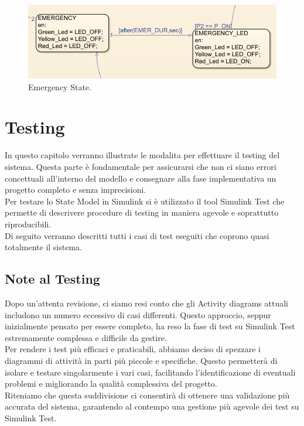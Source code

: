 \documentclass[12pt]{article}
\begin{document}
\begin{figure}[H]
    \centering
    \includegraphics[width=1\textwidth]{imm/Emergency.png}
    \caption{Emergency State.}
\end{figure}

\newpage
\section{Testing}

In questo capitolo verranno illustrate le modalita per effettuare il testing del sistema. Questa parte è fondamentale per assicurarsi che non ci siano errori concettuali all'interno del modello e consegnare alla fase implementativa un progetto completo e senza imprecisioni.\\
Per testare lo State Model in Simulink si è utilizzato il tool Simulink Test che permette di descrivere procedure di testing in maniera agevole e soprattutto riproducibili. \\
Di seguito verranno descritti tutti i casi di test eseguiti che coprono quasi totalmente il sistema.

\subsection{Note al Testing}
Dopo un'attenta revisione, ci siamo resi conto che gli Activity diagrams attuali includono un numero eccessivo di casi differenti. Questo approccio, seppur inizialmente pensato per essere completo, ha reso la fase di test su Simulink Test estremamente complessa e difficile da gestire.\\
Per rendere i test più efficaci e praticabili, abbiamo deciso di spezzare i diagrammi di attività in parti più piccole e specifiche. Questo permetterà di isolare e testare singolarmente i vari casi, facilitando l'identificazione di eventuali problemi e migliorando la qualità complessiva del progetto.\\
Riteniamo che questa suddivisione ci consentirà di ottenere una validazione più accurata del sistema, garantendo al contempo una gestione più agevole dei test su Simulink Test.
\end{document}
